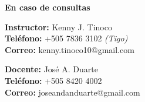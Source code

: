\vspace*{\fill}
\begin{flushright}
    \textbf{\large En caso de consultas}

    \textbf{Instructor:} Kenny J. Tinoco \\
    \textbf{Teléfono:} +505 7836 3102 \emph{(Tigo)} \\
    \textbf{Correo:} kenny.tinoco10@gmail.com

    \textbf{Docente:} José A. Duarte\\
    \textbf{Teléfono:} +505 8420 4002\\
    \textbf{Correo:} joseandanduarte@gmail.com

\end{flushright}
\vspace*{0cm}